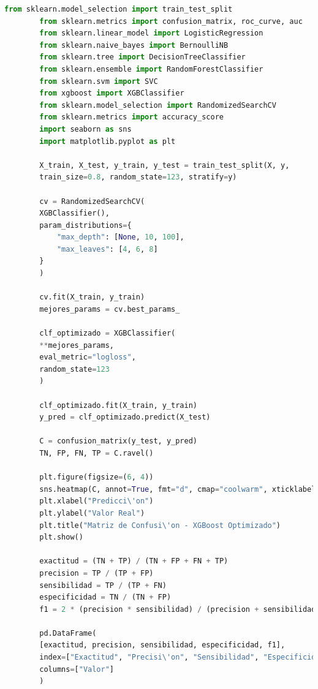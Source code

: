 \documentclass{article}
\begin{document}
\begin{lstlisting}[language=Python]
		from sklearn.model_selection import train_test_split
		from sklearn.metrics import confusion_matrix, roc_curve, auc
		from sklearn.linear_model import LogisticRegression
		from sklearn.naive_bayes import BernoulliNB
		from sklearn.tree import DecisionTreeClassifier
		from sklearn.ensemble import RandomForestClassifier
		from sklearn.svm import SVC
		from xgboost import XGBClassifier
		from sklearn.model_selection import RandomizedSearchCV
		from sklearn.metrics import accuracy_score
		import seaborn as sns
		import matplotlib.pyplot as plt
		
		X_train, X_test, y_train, y_test = train_test_split(X, y,
		train_size=0.8, random_state=123, stratify=y)
		
		cv = RandomizedSearchCV(
		XGBClassifier(),
		param_distributions={
			"max_depth": [None, 10, 100],
			"max_leaves": [4, 6, 8]
		}
		)
		
		cv.fit(X_train, y_train)
		mejores_params = cv.best_params_
		
		clf_optimizado = XGBClassifier(
		**mejores_params,
		eval_metric="logloss",
		random_state=123
		)
		
		clf_optimizado.fit(X_train, y_train)
		y_pred = clf_optimizado.predict(X_test)
		
		C = confusion_matrix(y_test, y_pred)
		TN, FP, FN, TP = C.ravel()
		
		plt.figure(figsize=(6, 4))
		sns.heatmap(C, annot=True, fmt="d", cmap="coolwarm", xticklabels=["<=50K", ">50K"], yticklabels=["<=50K", ">50K"])
		plt.xlabel("Predicci\'on")
		plt.ylabel("Valor Real")
		plt.title("Matriz de Confusi\'on - XGBoost Optimizado")
		plt.show()
		
		exactitud = (TN + TP) / (TN + FP + FN + TP)
		precision = TP / (TP + FP)
		sensibilidad = TP / (TP + FN)
		especificidad = TN / (TN + FP)
		f1 = 2 * (precision * sensibilidad) / (precision + sensibilidad)
		
		pd.DataFrame(
		[exactitud, precision, sensibilidad, especificidad, f1],
		index=["Exactitud", "Precisi\'on", "Sensibilidad", "Especificidad", "F1-Score"],
		columns=["Valor"]
		)
	\end{lstlisting}
	
	
	
\end{document}
